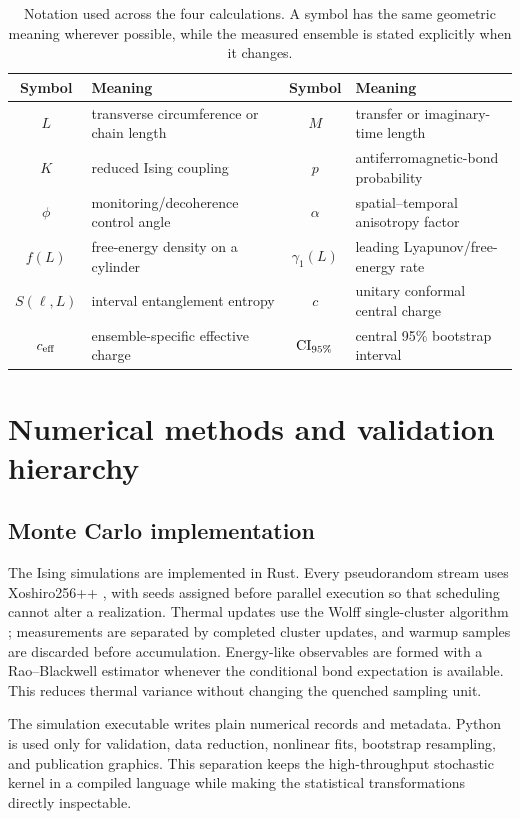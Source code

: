 \documentclass[aps,prb,reprint,superscriptaddress,longbibliography,floatfix]{revtex4-2}
\begin{document}
\begin{table}[t]
\caption{Notation used across the four calculations.  A symbol has the same
geometric meaning wherever possible, while the measured ensemble is stated
explicitly when it changes.}
\label{tab:notation}
\begin{ruledtabular}
\begin{tabular}{cl@{\qquad}cl}
Symbol & Meaning & Symbol & Meaning\\
\hline
$L$ & transverse circumference or chain length
& $M$ & transfer or imaginary-time length\\
$K$ & reduced Ising coupling
& $p$ & antiferromagnetic-bond probability\\
$\phi$ & monitoring/decoherence control angle
& $\alpha$ & spatial--temporal anisotropy factor\\
$f(L)$ & free-energy density on a cylinder
& $\gamma_1(L)$ & leading Lyapunov/free-energy rate\\
$S(\ell,L)$ & interval entanglement entropy
& $c$ & unitary conformal central charge\\
$c_{\rm eff}$ & ensemble-specific effective charge
& ${\rm CI}_{95\%}$ & central 95\% bootstrap interval
\end{tabular}
\end{ruledtabular}
\end{table}

\section{Numerical methods and validation hierarchy}
\label{sec:methods}

\subsection{Monte Carlo implementation}

The Ising simulations are implemented in Rust.  Every pseudorandom stream uses
Xoshiro256++ \cite{BlackmanVigna2021}, with seeds assigned before parallel
execution so that scheduling cannot alter a realization.  Thermal updates use
the Wolff single-cluster algorithm \cite{Wolff1989}; measurements are separated
by completed cluster updates, and warmup samples are discarded before
accumulation.  Energy-like observables are formed with a Rao--Blackwell
estimator whenever the conditional bond expectation is available.  This
reduces thermal variance without changing the quenched sampling unit.

The simulation executable writes plain numerical records and metadata.  Python
is used only for validation, data reduction, nonlinear fits, bootstrap
resampling, and publication graphics.  This separation keeps the
high-throughput stochastic kernel in a compiled language while making the
statistical transformations directly inspectable.
\end{document}
